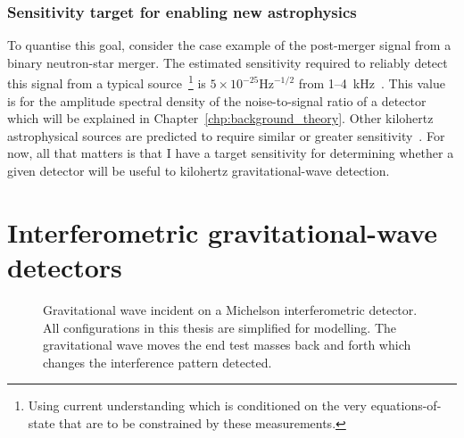 \subsubsection{Sensitivity target for enabling new astrophysics}
\label{sec:GW_kilohertz_target}

To quantise this goal, consider the case example of the post-merger signal from a binary neutron-star merger. The estimated sensitivity required to reliably detect this signal from a typical source~\footnote{Using current understanding which is conditioned on the very equations-of-state that are to be constrained by these measurements.} is $5\times10^{-25} \mathrm{Hz}^{-1/2}$ from 1--4~kHz~\cite{miaoDesignGravitationalWaveDetectors2018}. This value is for the amplitude spectral density of the noise-to-signal ratio of a detector which will be explained in Chapter~\ref{chp:background_theory}. Other kilohertz astrophysical sources are predicted to require similar or greater sensitivity~\cite{}. For now, all that matters is that I have a target sensitivity for determining whether a given detector will be useful to kilohertz gravitational-wave detection.


\section{Interferometric gravitational-wave detectors}
\label{sec:intro_IFO}

\begin{figure}
	\centering
	\caption{Gravitational wave incident on a Michelson interferometric detector. All configurations in this thesis are simplified for modelling. The gravitational wave moves the end test masses back and forth which changes the interference pattern detected.}
	\label{fig:GW_incident_Michelson}
\end{figure}

